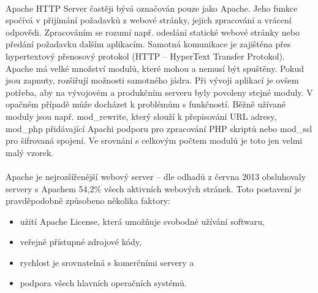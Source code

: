 \documentclass[11pt,a4paper,titlepage,oneside]{book}
\begin{document}

		\paragraph{} Apache HTTP Server častěji bývá označován pouze jako Apache. Jeho funkce spočívá v přijímání požadavků z webové stránky, jejich zpracování a vrácení odpovědi. Zpracováním se rozumí např. odeslání statické webové stránky nebo předání požadavku dalším aplikacím. Samotná komunikace je zajištěna přes hypertextový přenosový protokol (HTTP -- HyperText Transfer Protokol). Apache má velké množství modulů, které mohou a nemusí být spuštěny. Pokud jsou zapnuty, rozšiřují možnosti samotného jádra. Při vývoji aplikací je ovšem potřeba, aby na vývojovém a produkčním serveru byly povoleny stejné moduly. V opačném případě může docházet k problémům s funkčností. Běžně užívané moduly jsou např. mod\_rewrite, který slouží k přepisování URL adresy, mod\_php přidávající Apachi podporu pro zpracování PHP skriptů nebo mod\_ssl pro šifrovaná spojení. Ve srovnání s celkovým počtem modulů je toto jen velmi malý vzorek.


		\paragraph{} Apache je nejrozšířenější webový server -- dle odhadů z června 2013 obsluhovaly servery s Apachem 54,2\% všech aktivních webových stránek. Toto postavení je pravděpodobně způsobeno několika faktory:
		\begin{itemize}
			\item užití Apache License, která umožňuje svobodné užívání softwaru,
			\item veřejně přístupné zdrojové kódy,
			\item rychlost je srovnatelná s komerčními servery a 
			\item podpora všech hlavních operačních systémů.
		\end{itemize}
		
\end{document}
